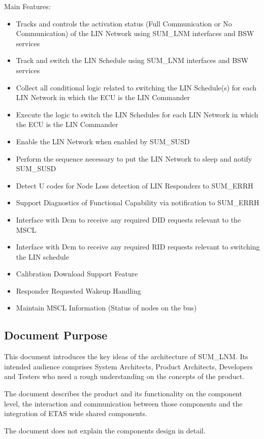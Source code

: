 Main Features:
\begin{itemize}
	\item Tracks and controls the activation status (Full Communication or No Communication) of the LIN Network using SUM\_LNM interfaces and BSW services
	\item Track and switch the LIN Schedule using SUM_LNM interfaces and BSW services
	\item Collect all conditional logic related to switching the LIN Schedule(s) for each LIN Network in which the ECU is the LIN Commander
	\item Execute the logic to switch the LIN Schedules for each LIN Network in which the ECU is the LIN Commander
	\item Enable the LIN Network when enabled by SUM\_SUSD
	\item Perform the sequence necessary to put the LIN Network to sleep and notify SUM\_SUSD
	\item Detect U codes for Node Loss detection of LIN Responders to SUM\_ERRH
	\item Support Diagnostics of Functional Capability via notification to SUM\_ERRH
	\item Interface with Dcm to receive any required DID requests relevant to the MSCL
	\item Interface with Dcm to receive any required RID requests relevant to switching the LIN schedule
	\item Calibration Download Support Feature
	\item Responder Requested Wakeup Handling
	\item Maintain MSCL Information (Status of nodes on the bus)
\end{itemize}

\subsection{Document Purpose}

This document introduces the key ideas of the architecture of SUM_LNM. Its intended audience comprises System Architects, Product Architects, Developers and Testers 
who need a rough understanding on the concepts of the product. 

The document describes the product and its functionality on the component level, the interaction and communication between those components and the integration of 
ETAS wide shared components.

The document does not explain the components design in detail.

